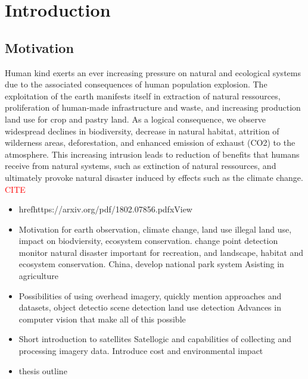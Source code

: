 
\chapter{Introduction}

\label{Chapter1}


\section{Motivation}
Human kind exerts an ever increasing pressure on natural and ecological systems due to the associated consequences of human population explosion. The exploitation of the earth manifests itself in extraction of natural ressources, proliferation of human-made infrastructure and waste, and increasing production land use for crop and pastry land. As a logical consequence, we observe widespread declines in biodiversity, 
decrease in natural habitat, attrition of wilderness areas, deforestation, and enhanced emission of exhaust (CO2) to the atmosphere. This increasing intrusion leads to reduction of benefits that humans receive from natural systems, such as extinction of natural ressources, and ultimately provoke natural disaster induced by effects such as the climate change. \textcolor{red}{CITE}



\begin{itemize}
	\item href{https://arxiv.org/pdf/1802.07856.pdf}{xView}
\end{itemize}

\begin{itemize}
\item Motivation for earth observation, climate change, land use illegal land use, impact on biodviersity, ecosystem conservation. change point detection monitor natural disaster
 important for recreation, and landscape, habitat and ecosystem conservation.
 China, develop national park system
 Asisting in agriculture
\item Possibilities of using overhead imagery, quickly mention approaches and datasets, object detectio scene detection  land use detection Advances in computer vision that make all of this possible
\item Short introduction to satellites Satellogic and capabilities of collecting and processing imagery data. Introduce cost and environmental impact
\item thesis outline
\end{itemize}



